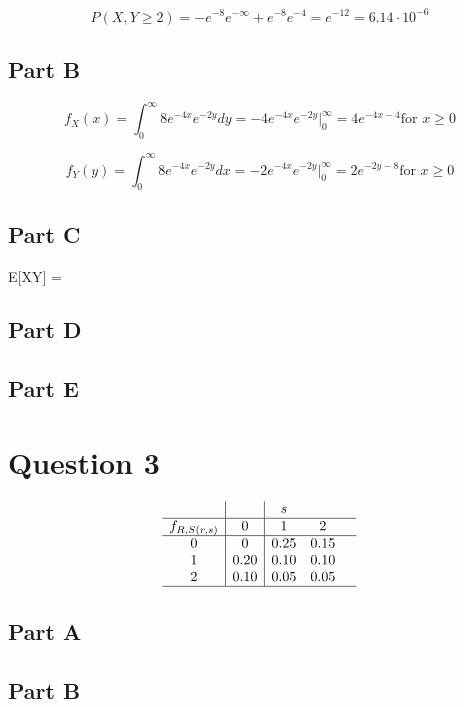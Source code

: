 \documentclass[letterpaper]{article}
\begin{document}
$$P(X, Y \geq 2) = -e^{-8}e^{-\infty} + e^{-8}e^{-4} = e^{-12} = 6.14 \cdot 10^{-6}$$

\subsection*{Part B}

$$f_X(x) = \int_0^{\infty} 8e^{-4x}e^{-2y} dy = -4e^{-4x}e^{-2y} \Big|_0^{\infty} = 4e^{-4x-4} \text{for } x \geq 0$$

$$f_Y(y) = \int_0^{\infty} 8e^{-4x}e^{-2y} dx = -2e^{-4x}e^{-2y} \Big|_0^{\infty} = 2e^{-2y-8} \text{for } x \geq 0$$

\subsection*{Part C}

E[XY] =

\subsection*{Part D}

\subsection*{Part E}

\newpage

\section*{Question 3}

$$\begin{array}{c|c|ccc}{} & {} & {s} & {} & {} \\ \hline f_{R, S(r, s)} & {0} & {1} & {2} \\ \hline 0 & {0} & {0.25} & {0.15} \\ {1} & {0.20} & {0.10} & {0.10} \\ {2} & {0.10} & {0.05} & {0.05} \\ \hline\end{array}$$

\subsection*{Part A}

\subsection*{Part B}
\end{document}
